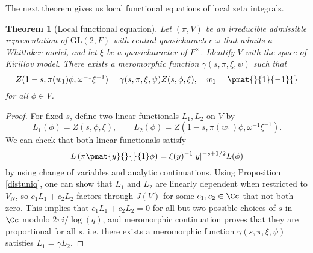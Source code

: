 \documentclass{article}
\newtheorem{theorem}{Theorem}[section]
\newcommand{\GL}{\mathrm{GL}}
\begin{document}
The next theorem gives us local functional equations of local zeta integrals.
\begin{theorem}[Local functional equation]
\label{localfe}
Let $(\pi, V)$ be an irreducible admissible representation of $\GL(2, F)$ with central quasicharacter $\omega$ that admits a Whittaker model, and let $\xi$ be a quasicharacter of $F^{\times}$. 
Identify $V$ with the space of Kirillov model. 
There exists a meromorphic function $\gamma(s, \pi, \xi, \psi)$ such that 
$$
Z(1-s, \pi(w_1)\phi, \omega^{-1}\xi^{-1}) = \gamma(s, \pi, \xi, \psi) Z(s, \phi, \xi), \quad w_1 = \pmat{}{1}{-1}{}
$$
for all $\phi\in V$. 
\end{theorem}
\begin{proof}
For fixed $s$, define two linear functionals $L_1, L_2$ on $V$ by 
$$
L_1(\phi) = Z(s, \phi, \xi), \qquad L_2(\phi) = Z(1-s, \pi(w_1)\phi, \omega^{-1}\xi^{-1}).
$$
We can check that both linear functionals satisfy 
$$
L\left( \pi\pmat{y}{}{}{1} \phi\right) = \xi(y)^{-1}|y|^{-s+1/2} L(\phi)
$$
by using change of variables and analytic continuations. 
Using Proposition \ref{distuniq}, one can show that $L_{1}$ and $L_{2}$ are linearly dependent when restricted to $V_N$, so $c_1 L_1 + c_2 L_2$ factors through $J(V)$ for some $c_1, c_2\in \Cc$ that not both zero. 
This implies that $c_1 L_1 + c_2 L_2 = 0$ for all but two possible choices of $s$ in $\Cc$ modulo $2\pi i / \log (q)$, and meromorphic continuation proves that they are proportional for all $s$, i.e. there exists a meromorphic function $\gamma(s, \pi, \xi, \psi)$ satisfies $L_{1} = \gamma L_{2}$. 
\end{proof}
\end{document}
